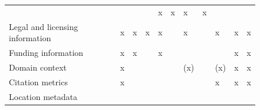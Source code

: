 \documentclass{article}
\begin{document}
\begin{figure}
\begin{tabular}{lllllllllll}
& 

& 

& 

& x

& x

& x

& x

\\
Legal and licensing information

& x

& x

& x

& x

& 

& x

& 

& x

& x

& x

\\
Funding information

& x

& x

& 

& x

& 

& 

& 

& 

& x

& x

\\
Domain context

& x

& 

& 

& 

& 

& (x)

& 

& (x)

& x

& x

\\
Citation metrics

& x

& 

& 

& 

& 

& 

& 

& x

& x

& x

\\
Location metadata


\end{tabular}
\end{figure}
\end{document}
